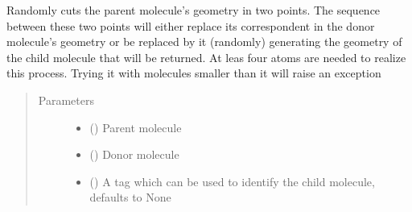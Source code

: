 \documentclass[letterpaper,10pt,english]{sphinxmanual}
\begin{document}

\begin{fulllineitems}
\label{\detokenize{MolOpt.molecular:MolOpt.molecular.molecular.crossover_2}}
\sphinxAtStartPar
Randomly cuts the parent molecule’s geometry in two points. The sequence between these two points will either 
replace its correspondent in the donor molecule’s geometry or be replaced by it (randomly) generating the geometry
of the child molecule that will be returned. At leas four atoms are needed to realize this process. Trying it with
molecules smaller than it will raise an exception
\begin{quote}\begin{description}
\item[{Parameters}] \leavevmode\begin{itemize}
\item {} 
\sphinxAtStartPar
{} ({\hyperref[\detokenize{MolOpt.molecular:MolOpt.molecular.molecular.Molecule}]{}}) \textendash{} Parent molecule

\item {} 
\sphinxAtStartPar
{} ({\hyperref[\detokenize{MolOpt.molecular:MolOpt.molecular.molecular.Molecule}]{}}) \textendash{} Donor molecule

\item {} 
\sphinxAtStartPar
{} (\sphinxstyleliteralemphasis{\sphinxupquote{, }}) \textendash{} A tag which can be used to identify the child molecule, defaults to None


\end{itemize}
\end{description}
\end{quote}
\end{fulllineitems}
\end{document}
